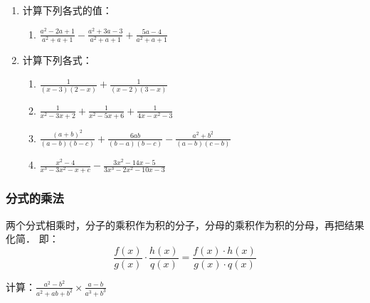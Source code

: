 \begin{ex}
\begin{enumerate}
    \item 计算下列各式的值：
  \begin{enumerate}
\item $\frac{a^{2}-2 a+1}{a^{2}+a+1}-\frac{a^{2}+3 a-3}{a^{2}+a+1}+\frac{5 a-4}{a^{2}+a+1}$
    
  \end{enumerate}

  \item 计算下列各式：
\begin{enumerate}
\item $\frac{1}{(x-3)(2-x)}+\frac{1}{(x-2)(3-x)}$
    \item  $\frac{1}{x^{2}-3 x+2}+\frac{1}{x^{2}-5 x+6}+\frac{1}{4 x-x^{2}-3}$
    \item  $\frac{(a+b)^{2}}{(a-b)(b-c)}+\frac{6 a b}{(b-a)(b-c)}-\frac{a^{2}+b^{2}}{(a-b)(c-b)}$
    \item  $\frac{x^{2}-4}{x^{3}-3 x^{2}-x+c}-\frac{3 x^{2}-14 x-5}{3 x^{3}-2 x^{2}-10 x-3}$
\end{enumerate}
\end{enumerate}  
\end{ex}

\subsubsection{分式的乘法}

两个分式相乘时，分子的乘积作为积的分子，分母的乘积作为积的分母，再把结果化简．
即：
\[\frac{f(x)}{g(x)}\cdot \frac{h(x)}{q(x)}=\frac{f(x)\cdot h(x)}{g(x)\cdot q(x)} \]


\begin{example}
    计算：$\frac{a^{2}-b^{2}}{a^{2}+a b+b^{2}} \times \frac{a-b}{a^{3}+b^{3}}$
\end{example}


